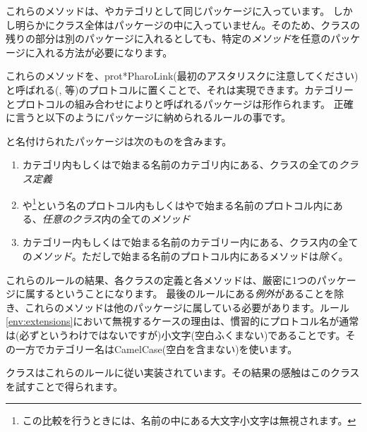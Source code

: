 \documentclass[a4paper,10pt,twoside]{book}
\begin{document}
\noindent
これらのメソッドは、やカテゴリとして同じパッケージに入っています。
しかし明らかにクラス全体はパッケージの中に入っていません。そのため、クラスの残りの部分は別のパッケージに入れるとしても、特定の\emph{メソッド}を任意のパッケージに入れる方法が必要になります。

これらのメソッドを、prot{*PharoLink}(最初のアスタリスクに注意してください)と呼ばれる(,  等)のプロトコルに置くことで、それは実現できます。カテゴリーとプロトコルの組み合わせによりと呼ばれるパッケージは形作られます。
正確に言うと以下のようにパッケージに納められるルールの事です。

と名付けられたパッケージは次のものを含みます。

\begin{enumerate}		
	\item{} カテゴリ内もしくはで始まる名前のカテゴリ内にある、クラスの全ての\emph{クラス定義}
	\item{} \label{env:extensions} や\footnote{この比較を行うときには、名前の中にある大文字小文字は無視されます。}という名のプロトコル内もしくはやで始まる名前のプロトコル内にある、\emph{任意のクラス}内の全ての\emph{メソッド}
	\item{} カテゴリー内もしくはで始まる名前のカテゴリー内にある、クラス内の全ての\emph{メソッド}。ただし\prot{*}で始まる名前のプロトコル内にあるメソッドは\emph{除く}。
	
\end{enumerate}
\noindent
これらのルールの結果、各クラスの定義と各メソッドは、厳密に1つのパッケージに属するということになります。
最後のルールにある\emph{例外}があることを除き、これらのメソッドは他のパッケージに属している必要があります。ルール\ref{env:extensions}において無視するケースの理由は、慣習的にプロトコル名が通常は(必ずというわけではないですが)小文字(空白ふくまない)であることです。その一方でカテゴリー名はCamelCase(空白を含まない)を使います。

クラスはこれらのルールに従い実装されています。その結果の感触はこのクラスを試すことで得られます。

\end{document}
